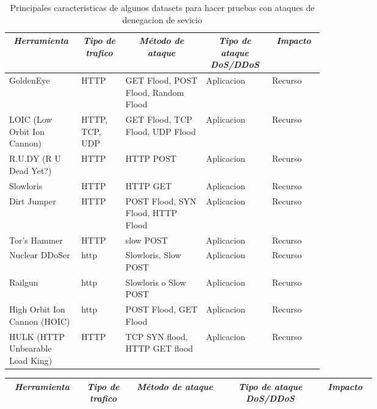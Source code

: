 \documentclass[12pt]{article}
\begin{document}
\newpage
\begin{landscape}

  \begin{table}[htbp]
      \tiny
\centering
\begin{tabular}{|p{0.1\linewidth}|p{0.1\linewidth}|p{0.2\linewidth}|p{0.1\linewidth}|p{0.1\linewidth}|}\hline
\multicolumn{1}{|c|}{\textit{\textbf{Herramienta}}} & 
\multicolumn{1}{c|}{\textit{\textbf{Tipo de trafico}}} &
\multicolumn{1}{|c|}{\textit{\textbf{Método de ataque}}} & 
\multicolumn{1}{|c|}{\textit{\textbf{Tipo de ataque DoS/DDoS}}} &
\multicolumn{1}{|c|}{\textit{\textbf{Impacto}}} \tabularnewline \hline

GoldenEye &
HTTP & 
GET Flood, POST Flood, Random Flood  & 
Aplicacion & 
Recurso
\tabularnewline \hline

LOIC (Low Orbit Ion Cannon) &
HTTP, TCP, UDP & 
GET Flood, TCP Flood, UDP Flood  & 
Aplicacion & 
Recurso
\tabularnewline \hline

R.U.DY (R U Dead Yet?) &
HTTP & 
HTTP POST  & 
Aplicacion & 
Recurso
\tabularnewline \hline

Slowloris &
HTTP & 
HTTP GET   & 
Aplicacion & 
Recurso
\tabularnewline \hline

Dirt Jumper &
HTTP & 
POST Flood, SYN Flood, HTTP Flood & 
Aplicacion & 
Recurso
\tabularnewline \hline

Tor’s Hammer &
HTTP & 
slow POST & 
Aplicacion & 
Recurso
\tabularnewline \hline

Nuclear DDoSer &
http & 
Slowloris, Slow POST & 
Aplicacion & 
Recurso
\tabularnewline \hline

Railgun &
http & 
Slowloris o Slow POST & 
Aplicacion & 
Recurso
\tabularnewline \hline

High Orbit Ion Cannon (HOIC) &
http & 
POST Flood, GET Flood & 
Aplicacion & 
Recurso
\tabularnewline \hline

HULK (HTTP Unbearable Load King) &
HTTP & 
TCP SYN flood, HTTP GET flood & 
Aplicacion & 
Recurso
\tabularnewline \hline

\end{tabular}
\caption{Principales caracteristicas de algunos datasets para hacer pruebas con ataques de denegacion de sevicio} \label{tab:sometab}
\end{table} 

\newpage

\begin{table}[htbp]
\centering
\begin{tabular}{|p{0.1\linewidth}|p{0.1\linewidth}|p{0.2\linewidth}|p{0.2\linewidth}|p{0.1\linewidth}|}\hline
\multicolumn{1}{|c|}{\textit{\textbf{Herramienta}}} & 
\multicolumn{1}{c|}{\textit{\textbf{Tipo de trafico}}} &
\multicolumn{1}{|c|}{\textit{\textbf{Método de ataque}}} & 
\multicolumn{1}{|c|}{\textit{\textbf{Tipo de ataque DoS/DDoS}}} &
\multicolumn{1}{|c|}{\textit{\textbf{Impacto}}} \tabularnewline \hline


\end{tabular}
\end{table}
\end{landscape}
\end{document}
